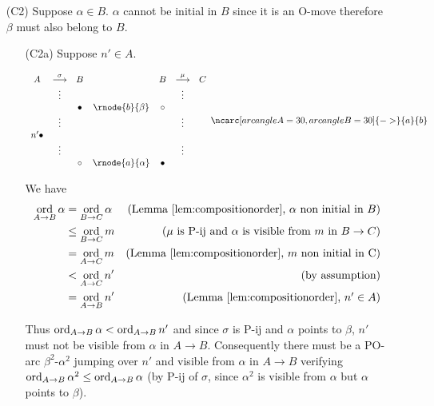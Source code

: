 \begin{itemize}
\begin{itemize}
\item[(C2)] Suppose $\alpha \in B$. $\alpha$ cannot be initial in $B$ since it is an O-move therefore $\beta$ must also belong to $B$.


\begin{itemize}
\item[(C2a)] Suppose $n' \in A$.

$$ 
\begin{array}{ccccccc}
A & \stackrel\sigma{\longrightarrow} & B & & B & \stackrel\mu{\longrightarrow} & C \\
&\vdots&&& & \vdots\\
&&\omove & \rnode{b}{\beta} & \pmove \\
&\vdots& & &&\vdots  \\
n' \omove && & &  \\
&\vdots& & &&\vdots  \\
&&\pmove & \rnode{a}{\alpha} & \omove \\
\end{array}
\ncarc[arcangleA=30,arcangleB=30]{->}{a}{b}
 $$  

We have
\begin{align}
\mathop{\mathrm{ord}}_{A\rightarrow B} \alpha & =  \mathop{\mathrm{ord}}_{B\rightarrow C} \alpha 
& \mbox{(Lemma \ref{lem:compositionorder}, $\alpha$ non initial in $B$)}  \nonumber \\
 & \leq  \mathop{\mathrm{ord}}_{B\rightarrow C} m 
& \mbox{($\mu$ is P-ij and $\alpha$ is visible from $m$ in $B\rightarrow C$)}  \nonumber \\
&= \mathop{\mathrm{ord}}_{A\rightarrow C} m 
& \mbox{(Lemma \ref{lem:compositionorder}, $m$ non initial in C)}  \nonumber \\
&<  \mathop{\mathrm{ord}}_{A\rightarrow C} n'  & \mbox{(by assumption)} \nonumber \\
&=  \mathop{\mathrm{ord}}_{A\rightarrow B} n'  & \mbox{(Lemma \ref{lem:compositionorder}, $n' \in A$)} \label{eq:alphaLTnprime}
\end{align}

Thus $\mathop{\mathrm{ord}}_{A\rightarrow B} \alpha < \mathop{\mathrm{ord}}_{A\rightarrow B} n'$
and since $\sigma$ is P-ij and $\alpha$ points to $\beta$, $n'$ must not be visible from $\alpha$ in $A\rightarrow B$. Consequently there must be a PO-arc $\beta^2$-$\alpha^2$ jumping over $n'$ and visible from $\alpha$ in $A\rightarrow B$
verifying $\mathop{\mathrm{ord}}_{A \rightarrow B} \alpha^2 
\leq \mathop{\mathrm{ord}}_{A \rightarrow B} \alpha$ (by P-ij of $\sigma$, since $\alpha^2$ is visible from $\alpha$ but $\alpha$ points to $\beta$). 



\end{itemize}
\end{itemize}
\end{itemize}
